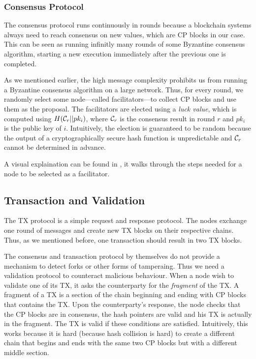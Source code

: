 \subsubsection*{Consensus Protocol} 
The consensus protocol runs continuously in rounds
because a blockchain systems always need to reach consensus on new values, which are CP blocks in our case.
This can be seen as running infinitly many rounds of some Byzantine consensus algorithm,
starting a new execution immediately after the previous one is completed.

As we mentioned earlier, the high message complexity prohibits us from running a Byzantine consensus algorithm on a large network.
Thus, for every round, we randomly select some node---called facilitators---to collect CP blocks and use them as the proposal.
The facilitators are elected using a \emph{luck value}, which is computed using $H(\mathcal{C}_r || pk_i)$,
where $\mathcal{C}_r$ is the consensus result in round $r$ and $pk_i$ is the public key of $i$.
Intuitively, the election is guaranteed to be random 
because the output of a cryptographically secure hash function is unpredictable and $\mathcal{C}_r$ cannot be determined in advance.

A visual explaination can be found in ,
it walks through the steps needed for a node to be selected as a facilitator.

\subsection{Transaction and Validation}
The TX protocol is a simple request and response protocol.
The nodes exchange one round of messages and create new TX blocks on their respective chains.
Thus, as we mentioned before, one transaction should result in two TX blocks.

The consensus and transaction protocol by themselves do not provide a mechanism to detect forks or other forms of tamperaing.
Thus we need a validation protocol to counteract malicious behaviour.
When a node wish to validate one of its TX, it asks the counterparty for the \emph{fragment} of the TX.
A fragment of a TX is a section of the chain beginning and ending with CP blocks that contains the TX.
Upon the counterparty's response, the node checks that the CP blocks are in consensus, the hash pointers are valid and his TX is actually in the fragment.
The TX is valid if these conditions are satisfied.
Intuitively, this works because it is hard (because hash collision is hard)
 to create a different chain that begins and ends with the same two CP blocks but with a different middle section.


